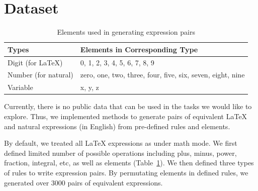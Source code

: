 \documentclass{article}
\begin{document}
\section{Dataset}
\begin{table}
    \caption{Elements used in generating expression pairs}
    \label{element}
    \centering
    \begin{tabular}{|p{3cm}||p{8cm}|  }
        \hline
        Types& Elements in Corresponding Type \\
        \hline
        \hline
        Digit (for LaTeX)& 0, 1, 2, 3, 4, 5, 6, 7, 8, 9   \\
        \hline
        Number (for natural)& zero, one, two, three, four, five, six, seven, eight, nine \\
        \hline
        Variable & x, y, z \\
        \hline
    \end{tabular}
\end{table}
%
Currently, there is no public data that can be used in the tasks we would like to explore. Thus, we implemented methods to generate pairs of equivalent LaTeX and natural expressions (in English) from pre-defined rules and elements. \par 
By default, we treated all LaTeX expressions as under math mode. We first defined limited number of possible operations including plus, minus, power, fraction, integral, etc, as well as elements (Table~\ref{element}). We then defined three types of rules to write expression pairs. By permutating elements in defined rules, we generated over 3000 pairs of equivalent expressions.
%
\end{document}
